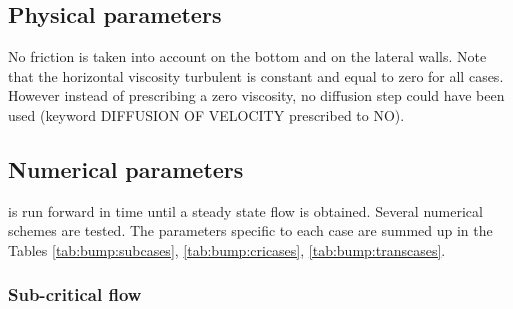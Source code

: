 \subsection{Physical parameters}

No friction is taken into account on the bottom and on the lateral walls.
Note that the horizontal viscosity turbulent is constant and equal to zero for all cases.
However instead of prescribing a zero viscosity, no diffusion step could
have been used (keyword DIFFUSION OF VELOCITY prescribed to NO).

\subsection{Numerical parameters}

 is run forward in time until a steady state flow is obtained.
Several numerical schemes are tested.
The parameters specific to each case are summed up in the Tables
\ref{tab:bump:subcases}, \ref{tab:bump:cricases}, \ref{tab:bump:transcases}.

\subsubsection{Sub-critical flow}
\begin{table}[H]
  \caption{List of the simulation parameters used for the cases tested in the sub-critical bump example.}
  \label{tab:bump:subcases}
\end{table}
